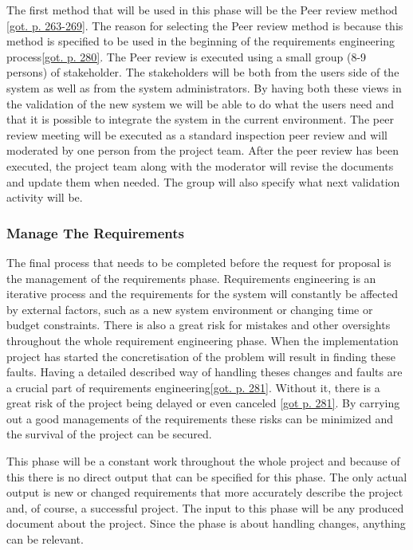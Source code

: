 \documentclass[a4paper]{article}
\begin{document}
The first method that will be used in this phase will be the Peer review method \ref{got. p. 263-269}. The reason for selecting the Peer review method is because this method is specified to be used in the beginning of the requirements engineering process\ref{got. p. 280}. The Peer review is executed using a small group (8-9 persons) of stakeholder. The stakeholders will be both from the users side of the system as well as from the system administrators. By having both these views in the validation of the new system we will be able to do what the users need and that it is possible to integrate the system in the current environment. The peer review meeting will be executed as a standard inspection peer review and will moderated by one person from the project team. After the peer review has been executed, the project team along with the moderator will revise the documents and update them when needed. The group will also specify what next validation activity will be.

\subsubsection{Manage The Requirements}
\label{subsub:manage_the_requirements}
The final process that needs to be completed before the request for proposal is the management of the requirements phase. Requirements engineering is an iterative process and the requirements for the system will constantly be affected by external factors, such as a new system environment or changing time or budget constraints. There is also a great risk for mistakes and other oversights throughout the whole requirement engineering phase. When the implementation project has started the concretisation of the problem will result in finding these faults. Having a detailed described way of handling theses changes and faults are a crucial part of requirements engineering\ref{got. p. 281}. Without it, there is a great risk of the project being delayed or even canceled \ref{got p. 281}. By carrying out a good managements of the requirements these risks can be minimized and the survival of the project can be secured. 

This phase will be a constant work throughout the whole project and because of this there is no direct output that can be specified for this phase. The only actual output is new or changed requirements that more accurately describe the project and, of course, a successful project. The input to this phase will be any produced document about the project. Since the phase is about handling changes, anything can be relevant.
\end{document}
